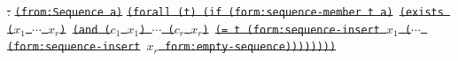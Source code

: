 \documentclass[10pt,fleqn,final]{scrreprt}
\newenvironment{definitions}[0]{\medskip }{}
\newcommand{\white}[1]{{\color{white}{#1}}}
\newcommand{\qqquad}{\white{x}\qquad}
\providecommand{\DIFdel}[1]{{\protect\color{red}\sout{#1}}}                      %
\providecommand{\DIFdelend}{} %
\begin{document}
\begin{definitions}
\begin{itemize}[topsep=0pt, label=--, leftmargin=*]
\DIFdel{:}%
\texttt{\DIFdel{(from:Sequence a)}}%
\texttt{\DIFdel{(forall (t) (if (form:sequence-member t a)}%
\DIFdel{(exists ($x_1$ $\cdots$ $x_r$)}%
\DIFdel{(and ($c_1$ $x_1$) $\cdots$ ($c_r$ $x_r$)}%
\DIFdel{(= t (form:sequence-insert $x_1$ ($\cdots$ (form:sequence-insert}%
\DIFdel{$x_r$ form:empty-sequence))))))))}}
\DIFdelend 


\end{itemize}
\end{definitions}
\end{document}
